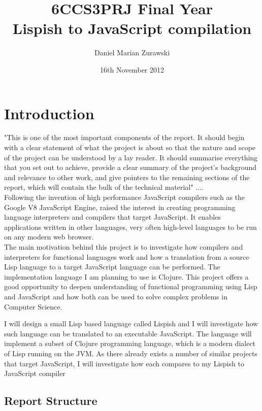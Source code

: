 \documentclass[11pt]{informatics-report}
\title{6CCS3PRJ Final Year\\\vspace{0.2cm}Lispish to JavaScript compilation}
\author{Daniel Marian Zurawski}
\date{16th November 2012}
\begin{document}
\createFrontMatter
\onehalfspacing
\tableofcontents
\doublespacing


\chapter{Introduction}
"This is one of the most important components of the report. It should begin with a clear statement of what the project is about so that the nature and scope of the project can be understood by a lay reader. It should summarise everything that you set out to achieve, provide a clear summary of the project's background and relevance to other work, and give pointers to the remaining sections of the report, which will contain the bulk of the technical material"  .... \\
Following the invention of high performance JavaScript compilers such as the Google V8 JavaScript Engine, raised the interest in creating programming language interpreters and compilers that target JavaScript. It enables applications written in other languages, very often high-level languages to be run on any modern web browser. \\
 
The main motivation behind this project is to investigate how compilers and interpreters for functional languages work and how a translation from a source Lisp language to a target JavaScript language can be performed. The implementation language I am planning to use is Clojure. This project offers a good opportunity to deepen understanding of functional programming using Lisp and JavaScript and how both can be used to solve complex problems in Computer Science. 

I will design a small Lisp based language called Lispish and I will investigate how such language can be translated to an executable JavaScript. The language will implement a subset of Clojure programming language, which is a modern dialect of Lisp running on the JVM.
As there already exists a number of similar projects that target JavaScript, I will investigate how each compares to my Lispish to JavaScript compiler

\section{Report Structure}











\appendix



\end{document}
